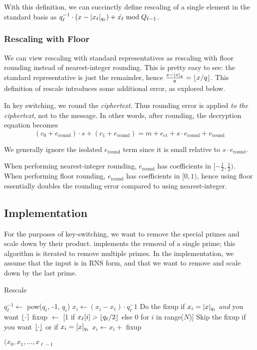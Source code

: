 \documentclass[../keyswitching.tex]{subfiles}
\begin{document}
With this definition, we can succinctly define rescaling of a single element in the standard basis as $q_\ell^{-1}\cdot(x-\lvert x_\ell\rvert_{q_\ell})+\hat{x_\ell} \bmod Q_{\ell-1}$.

\subsubsection{Rescaling with Floor}
\label{sec:roundingerr}
We can view rescaling with standard representatives as rescaling with floor rounding instead of nearest-integer rounding. This is pretty easy to see: the standard representative is just the remainder, hence $\frac{x-\lvert x\rvert_q}{q} = \lfloor x/q\rfloor$. This definition of rescale introduces some additional error, as explored below.

In key switching, we round the \emph{ciphertext}. Thus rounding error is applied \emph{to the ciphertext}, not to the message. In other words, after rounding, the decryption equation becomes
\[(c_0 + e_\mathrm{round})\cdot s + (c_1 + e_\mathrm{round}) = m + e_\mathrm{ct} + s\cdot e_\mathrm{round} +e_\mathrm{round}\]

We generally ignore the isolated $e_\mathrm{round}$ term since it is small relative to $s\cdot e_\mathrm{round}$.

When performing nearest-integer rounding, $e_\mathrm{round}$ has coefficients in $[-\frac{1}{2}, \frac{1}{2})$. When performing floor rounding, $e_\mathrm{round}$ has coefficients in $[0, 1)$, hence using floor essentially doubles the rounding error compared to using nearest-integer.

\subsection{Implementation}
For the purposes of key-switching, we want to remove the special primes and scale down by their product.  implements the removal of a single prime; this algorithm is iterated to remove multiple primes. In the implementation, we assume that the input is in RNS form, and that we want to remove and scale down by the last prime.

\begin{algorithm}
	\caption{Rescale}\label{alg:rescale}
	\begin{algorithmic}[1]
		\State $q_\ell^{-1} \gets $ pow($q_\ell$, -1, $q_i$)
		\State $x_i \gets (x_i - x_\ell)\cdot q_\ell^-1$
		\EndFor
		\State \Comment Do the fixup if $x_i=\lvert x\rvert_{q_i}$ \emph{and} you want $\lfloor\cdot\rceil$
		\State fixup $\gets$ [1 if $x_\ell[i]>\lfloor q_\ell/2\rfloor$ else 0 for $i$ in range($N$)]
		\Comment Skip the fixup if you want $\lfloor\cdot\rfloor$ or if $x_i=[x]_{q_i}$
		\State $x_i \gets x_i +$ fixup
		\EndFor
		
		\State \Return $(x_0, x_1, \ldots, x_{\ell-1}$
		\EndProcedure
	\end{algorithmic}
\end{algorithm}
\end{document}
